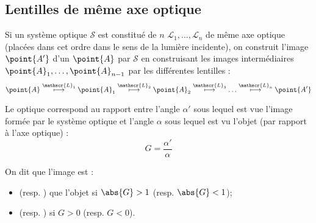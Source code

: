 \subsection{Lentilles de même axe optique}

\begin{propriete}
Si un système optique $\mathscr{S}$ est constitué de $n$  $\mathscr{L}_1, \ldots, \mathscr{L}_n$ de même axe optique (placées dans cet ordre dans le sens de la lumière incidente), on construit l'image $\point{A'}$ d'un  $\point{A}$ par $\mathscr{S}$ en construisant les images intermédiaires $\point{A}_1, \ldots, \point{A}_{n-1}$ par les différentes lentilles :
\[\point{A} \stackrel{\mathscr{L}_1}{\longmapsto} \point{A}_1 \stackrel{\mathscr{L}_2}{\longmapsto} \point{A}_2 \stackrel{\mathscr{L}_3}{\longmapsto} \ldots \stackrel{\mathscr{L}_n}{\longmapsto} \point{A'}\]
\end{propriete}

\begin{definition}
Le  optique correspond au rapport entre l’angle $\alpha'$ sous lequel est vue l’image formée par le système optique et l’angle $\alpha$ sous lequel est vu l’objet (par rapport à l'axe optique) :
\[G = \frac{\alpha'}{\alpha}\] 
\end{definition}

\begin{vocabulaire}
On dit que l'image est :
\begin{itemize}
\item {} (resp. ) que l'objet si $\abs{G} > 1$ (resp. $\abs{G} < 1$);
\item {} (resp. ) si $G > 0$ (resp. $G < 0$).
\end{itemize}
\end{vocabulaire}

